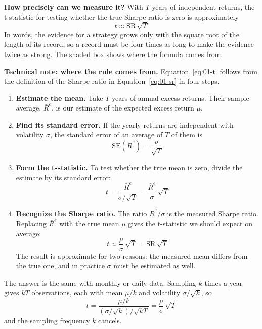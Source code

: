 \textbf{How precisely can we measure it?} With $T$ years of independent returns, the t-statistic for testing whether the true Sharpe ratio is zero is approximately
\begin{equation}
  t \approx \mathrm{SR}\,\sqrt{T}
  \label{eq:01-t}
\end{equation}
In words, the evidence for a strategy grows only with the square root of the length of its record, so a record must be four times as long to make the evidence twice as strong. The shaded box shows where the formula comes from.

\begin{technote}
\textbf{Technical note: where the rule comes from.} Equation~\eqref{eq:01-t} follows from the definition of the Sharpe ratio in Equation~\eqref{eq:01-sr} in four steps.

\begin{enumerate}
  \item \textbf{Estimate the mean.} Take $T$ years of annual excess returns. Their sample average, $\bar{R}^{e}$, is our estimate of the expected excess return $\mu$.
  \item \textbf{Find its standard error.} If the yearly returns are independent with volatility $\sigma$, the standard error of an average of $T$ of them is
  \begin{equation}
    \mathrm{SE}(\bar{R}^{e}) = \frac{\sigma}{\sqrt{T}} \nonumber
  \end{equation}
  \item \textbf{Form the t-statistic.} To test whether the true mean is zero, divide the estimate by its standard error:
  \begin{equation}
    t = \frac{\bar{R}^{e}}{\sigma/\sqrt{T}} = \frac{\bar{R}^{e}}{\sigma}\,\sqrt{T} \nonumber
  \end{equation}
  \item \textbf{Recognize the Sharpe ratio.} The ratio $\bar{R}^{e}/\sigma$ is the measured Sharpe ratio. Replacing $\bar{R}^{e}$ with the true mean $\mu$ gives the t-statistic we should expect on average:
  \begin{equation}
    t \approx \frac{\mu}{\sigma}\,\sqrt{T} = \mathrm{SR}\,\sqrt{T} \nonumber
  \end{equation}
  The result is approximate for two reasons: the measured mean differs from the true one, and in practice $\sigma$ must be estimated as well.
\end{enumerate}

The answer is the same with monthly or daily data. Sampling $k$ times a year gives $kT$ observations, each with mean $\mu/k$ and volatility $\sigma/\sqrt{k}$, so
\begin{equation}
  t = \frac{\mu/k}{(\sigma/\sqrt{k})/\sqrt{kT}} = \frac{\mu}{\sigma}\,\sqrt{T} \nonumber
\end{equation}
and the sampling frequency $k$ cancels.
\end{technote}

